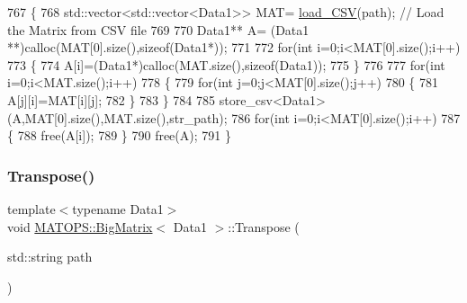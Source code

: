\begin{DoxyCode}
767                         \{
768                             std::vector<std::vector<Data1>> MAT= \hyperlink{classMATOPS_1_1BigMatrix_a43e1704cb38eb6d0121be5b71014eb8e}{load\_CSV}(path); \textcolor{comment}{// Load the Matrix
       from CSV file}
769 
770                             Data1** A= (Data1 **)calloc(MAT[0].size(),\textcolor{keyword}{sizeof}(Data1*));
771 
772                             \textcolor{keywordflow}{for}(\textcolor{keywordtype}{int} i=0;i<MAT[0].size();i++)
773                                 \{
774                                         A[i]=(Data1*)calloc(MAT.size(),\textcolor{keyword}{sizeof}(Data1));
775                                 \}
776 
777                                 \textcolor{keywordflow}{for}(\textcolor{keywordtype}{int} i=0;i<MAT.size();i++)
778                                 \{
779                                         \textcolor{keywordflow}{for}(\textcolor{keywordtype}{int} j=0;j<MAT[0].size();j++)
780                                         \{
781                                                 A[j][i]=MAT[i][j];
782                                         \}
783                                 \}
784 
785                                 store\_csv<Data1>(A,MAT[0].size(),MAT.size(),str\_path);
786                                 \textcolor{keywordflow}{for}(\textcolor{keywordtype}{int} i=0;i<MAT[0].size();i++)
787                                 \{
788                                         free(A[i]);
789                                 \}
790                                 free(A);
791                         \}
\end{DoxyCode}
\mbox{\label{classMATOPS_1_1BigMatrix_a1a6d446f0a7e13eae2de1c6702acd706}} 
\subsubsection{\texorpdfstring{Transpose()}{Transpose()}\hspace{0.1cm}{\footnotesize\ttfamily [2/2]}}
{\footnotesize\ttfamily template$<$typename Data1$>$ \\
void \hyperlink{classMATOPS_1_1BigMatrix}{M\+A\+T\+O\+P\+S\+::\+Big\+Matrix}$<$ Data1 $>$\+::Transpose (\begin{DoxyParamCaption}\item[{std\+::string}]{path }\end{DoxyParamCaption})\hspace{0.3cm}{\ttfamily [inline]}}




